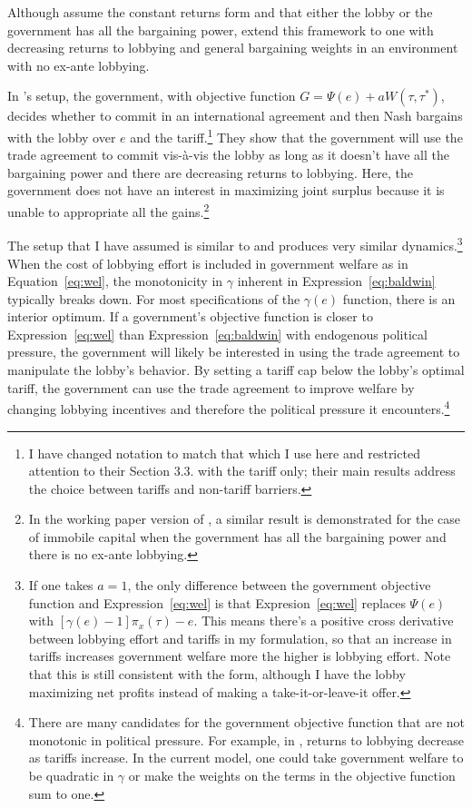 \documentclass[12pt]{article}
\newcommand{\ga}{\gamma}
\begin{document}
Although \Textcite{mrc2007} assume the constant returns form and that either the lobby or the government has all the bargaining power, \Textcite{lt} extend this framework to one with decreasing returns to lobbying and general bargaining weights in an environment with no ex-ante lobbying.

In \Textcite{lt}'s setup, the government, with objective function $G = \Psi(e) + aW(\tau,\tau^*)$, decides whether to commit in an international agreement and then Nash bargains with the lobby over $e$ and the tariff.\footnote{I have changed notation to match that which I use here and restricted attention to their Section 3.3. with the tariff only; their main results address the choice between tariffs and non-tariff barriers.} They show that the government will use the trade agreement to commit vis-\`{a}-vis the lobby as long as it doesn't have all the bargaining power and there are decreasing returns to lobbying. Here, the government does not have an interest in maximizing joint surplus because it is unable to appropriate all the gains.\footnote{In the working paper version of \Textcite{mrc2007}, a similar result is demonstrated for the case of immobile capital when the government has all the bargaining power and there is no ex-ante lobbying.}

The setup that I have assumed is similar to \Textcite{lt} and produces very similar dynamics.\footnote{If one takes $a=1$, the only difference between the \Textcite{lt} government objective function and Expression~\ref{eq:wel} is that Expresion~\ref{eq:wel} replaces $\Psi(e)$ with $[\ga(e) - 1]\pi_x(\tau) - e$. This means there's a positive cross derivative between lobbying effort and tariffs in my formulation, so that an increase in tariffs increases government welfare more the higher is lobbying effort. Note that this is still consistent with the \Textcite{dgh97} form, although I have the lobby maximizing net profits instead of making a take-it-or-leave-it offer. } When the cost of lobbying effort is included in government welfare as in Equation~\ref{eq:wel}, the monotonicity in $\ga$ inherent in Expression~\ref{eq:baldwin} typically breaks down. For most specifications of the $\ga(e)$ function, there is an interior optimum. If a government's objective function is closer to Expression~\ref{eq:wel} than Expression~\ref{eq:baldwin} with endogenous political pressure, the government will likely be interested in using the trade agreement to manipulate the lobby's behavior. By setting a tariff cap below the lobby's optimal tariff, the government can use the trade agreement to improve welfare by changing lobbying incentives and therefore the political pressure it encounters.\footnote{There are many candidates for the government objective function that are not monotonic in political pressure. For example, in \Textcite{ethier2012}, returns to lobbying decrease as tariffs increase. In the current model, one could take government welfare to be quadratic in $\ga$ or make the weights on the terms in the objective function sum to one.}
\end{document}
